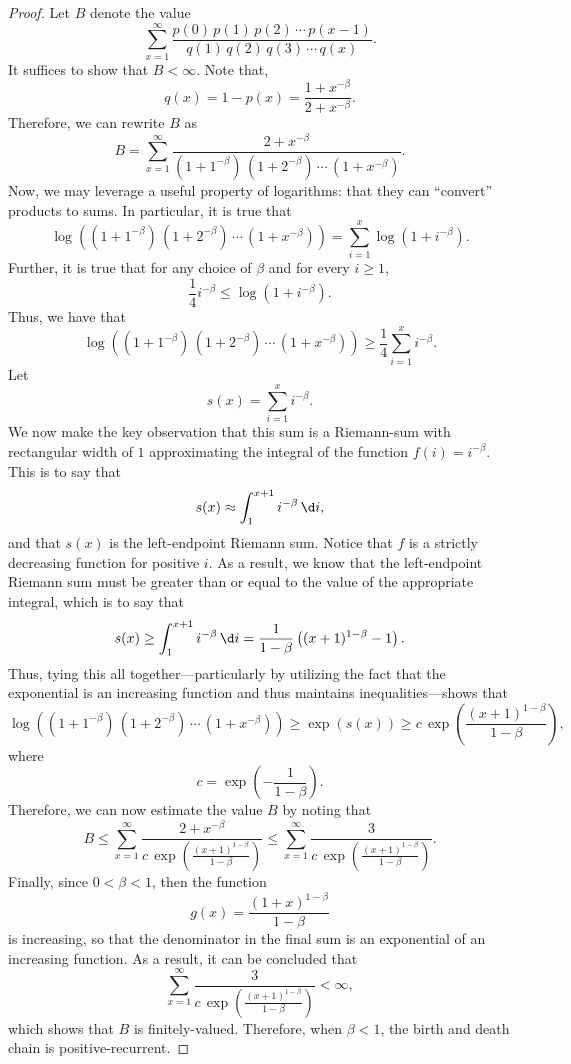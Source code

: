 \begin{proof}
    Let $B$ denote the value
    \[
        \sum_{x=1}^{\infty} \frac{p(0)\, p(1)\, p(2)\, \cdots\, p(x-1)}{q(1)\, q(2)\, q(3)\, \cdots \,
        q(x)}.
    \]
    It suffices to show that $B < \infty$. Note that,
    \[
        q(x) = 1 - p(x) = \frac{1+x^{-\beta}}{2+x^{-\beta}}.
    \]
    Therefore, we can rewrite $B$ as
    \[
        B = \sum_{x=1}^{\infty} \frac{2+x^{-\beta}}{(1+1^{-\beta})\, (1+2^{-\beta})\, \cdots \,
        (1+x^{-\beta})}.  
    \]
    Now, we may leverage a useful property of logarithms: that they can ``convert'' products to sums. In
    particular, it is true that
    \[
        \log\left((1+1^{-\beta})\, (1+2^{-\beta})\, \cdots \, (1+x^{-\beta})\right) = \sum_{i=1}^x
        \log\left(1+i^{-\beta}\right).
    \]
    Further, it is true that for any choice of $\beta$ and for every $i \geq 1$,
    \[
        \frac{1}{4} i^{-\beta} \leq \log\left(1+i^{-\beta}\right).
    \]
    Thus, we have that
    \[
        \log\left((1+1^{-\beta})\, (1+2^{-\beta})\, \cdots \, (1+x^{-\beta})\right) \geq
        \frac{1}{4}\sum_{i=1}^x i^{-\beta}.
    \]
    Let
    \[
        s(x) = \sum_{i=1}^x i^{-\beta}.
    \]
    We now make the key observation that this sum is a Riemann-sum with rectangular width of $1$
    approximating the integral of the function $f(i) = i^{-\beta}$. This is to say that
    \[
        s(x) \approx \int_1^{x+1} i^{-\beta} \, \d i,
    \]
    and that $s(x)$ is the left-endpoint Riemann sum. Notice that $f$ is a strictly decreasing function
    for positive $i$. As a result, we know that the left-endpoint Riemann sum must be greater than or
    equal to the value of the appropriate integral, which is to say that
    \[
        s(x) \geq \int_1^{x+1} i^{-\beta} \, \d i = \frac{1}{1-\beta}\left((x+1)^{1-\beta} - 1\right).
    \]
    Thus, tying this all together---particularly by utilizing the fact that the exponential is an
    increasing function and thus maintains inequalities---shows that
    \[
        \log\left((1+1^{-\beta})\, (1+2^{-\beta})\, \cdots \, (1+x^{-\beta})\right) \geq \exp(s(x)) \geq
        c \,\exp\left(\frac{(x+1)^{1-\beta}}{1-\beta}\right),
    \]
    where
    \[
        c = \exp\left(-\frac{1}{1-\beta}\right).  
    \]
    Therefore, we can now estimate the value $B$ by noting that
    \[
        B \leq \sum_{x=1}^{\infty} \frac{2+x^{-\beta}}{c\,
        \exp\left(\frac{(x+1)^{1-\beta}}{1-\beta}\right)} \leq \sum_{x=1}^{\infty} \frac{3}{c\,
        \exp\left(\frac{(x+1)^{1-\beta}}{1-\beta}\right)}.
    \]
    Finally, since $0 < \beta < 1$, then the function
    \[
        g(x) = \frac{(1+x)^{1-\beta}}{1-\beta}
    \]
    is increasing, so that the denominator in the final sum is an exponential of an increasing function.
    As a result, it can be concluded that
    \[
        \sum_{x=1}^{\infty} \frac{3}{c\, \exp\left(\frac{(x+1)^{1-\beta}}{1-\beta}\right)} < \infty,
    \]
    which shows that $B$ is finitely-valued. Therefore, when $\beta < 1$, the birth and death chain is
    positive-recurrent.
\end{proof}
